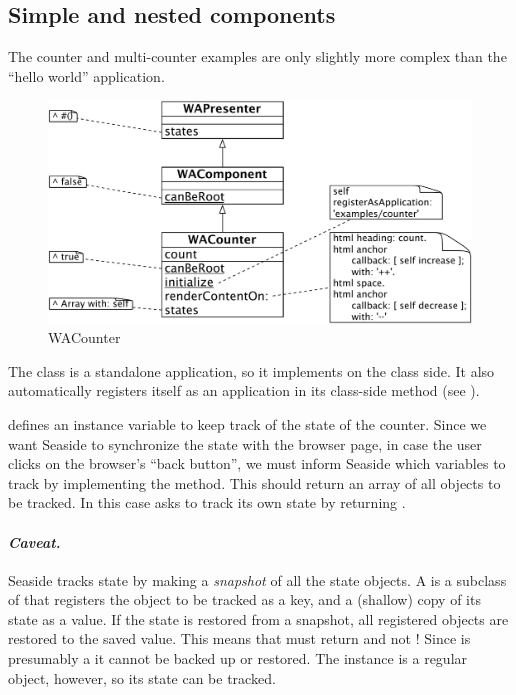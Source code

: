 \documentclass[a4paper,10pt,twoside]{book}
\begin{document}
\subsection{Simple and nested components}

The counter and multi-counter examples are only slightly more complex than the ``hello world'' application.

\begin{figure}[ht]
\begin{center}
\includegraphics[width=\textwidth]{WACounter}
\caption{WACounter}
\label{fig:WACounter}
\end{center}
\end{figure}

The class  is a standalone application, so it implements  on the class side.
It also automatically registers itself as an application in its class-side  method (see ).

 defines an instance variable  to keep track of the state of the counter.
Since we want Seaside to synchronize the state with the browser page, \ie in case the user clicks on the browser's ``back button'', we must inform Seaside which variables to track by implementing the  method.
This should return an array of all objects to be tracked.
In this case  asks to track its own state by returning .

\paragraph{\emph{Caveat.}}
Seaside tracks state by making a \emph{snapshot} of all the state objects.
A  is a subclass of  that registers the object to be tracked as a key, and a (shallow) copy of its state as a value.
If the state is restored from a snapshot, all registered objects are restored to the saved value.
This means that  must return  and not !  Since  is presumably a  it cannot be backed up or restored. The  instance is a regular object, however, so its state can be tracked.
\end{document}
